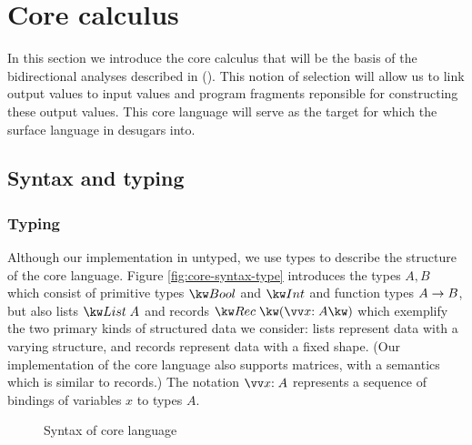 \section{Core calculus}
\label{sec:core-language}

In this section we introduce the core calculus that will be the basis of the bidirectional analyses described in (). This notion of selection will allow us to link output values to input values and program fragments reponsible for constructing these output values. This core language will serve as the target for which the surface language in  desugars into.

\subsection{Syntax and typing}
\label{sec:core-language:syntax-typing}
\subsubsection{Typing}
Although our implementation in untyped, we use types to describe the structure of the core language.
Figure \ref{fig:core-syntax-type} introduces the types $A, B$ which consist of primitive types $\tyBool$ and $\tyInt$ and function types ${A}\rightarrow{B}$, but also lists $\tyList{A}$ and records $\tyRec{\vec{\bind{x}{A}}}$ which exemplify the two primary kinds of structured data we consider: lists represent data with a varying structure, and records represent data with a fixed shape. (Our implementation of the core language also supports matrices, with a semantics which is similar to records.) The notation $\seq{\bind{x}{A}}$ represents a sequence of bindings of variables $x$ to types $A$.

\begin{figure}
   \begin{syntaxfig}
      
      
   \end{syntaxfig}
   \caption{Syntax of core language}
   \label{fig:core-language:syntax}
\end{figure}

